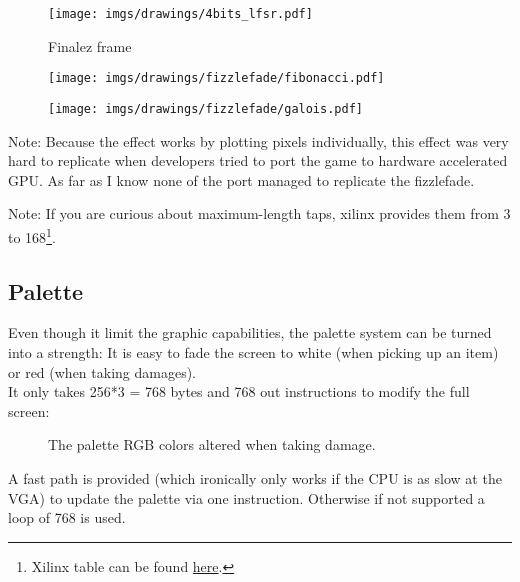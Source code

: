 \par

\begin{figure}[H]
 \centering
  \texttt{[image: imgs/drawings/4bits\_lfsr.pdf]}
 \caption{Finalez frame} 
\end{figure}

\par
\begin{minipage}{\textwidth}

\end{minipage}
\par

\begin{figure}[H] \centering \texttt{[image: imgs/drawings/fizzlefade/fibonacci.pdf]} \end{figure}
\begin{figure}[H] \centering \texttt{[image: imgs/drawings/fizzlefade/galois.pdf]} \end{figure}
      
Note: Because the effect works by plotting pixels individually, this effect was very hard to replicate when developers tried to port the game to hardware accelerated GPU. As far as I know none of the port managed to replicate the fizzlefade.

Note: If you are curious about maximum-length taps, xilinx provides them from 3 to 168\footnote{Xilinx table can be found \href{http://www.xilinx.com/support/documentation/application\_notes/xapp052.pdf}{here}.}.










\subsection{Palette}
Even though it limit the graphic capabilities, the palette system can be turned into a strength: It is easy to fade the screen to white (when picking up an item) or red (when taking damages).\\
It only takes 256*3 = 768 bytes and 768 out instructions to modify the full screen:
\begin{figure}[H]
  \centering
 \caption{The palette RGB colors altered when taking damage.} \label{fig:palette_damage}
\end{figure}
A fast path is provided (which ironically only works if the CPU is as slow at the VGA) to update the palette via one  instruction. Otherwise if not supported a loop of 768  is used.\\
\par
\begin{minipage}{\linewidth}

\end{minipage}








